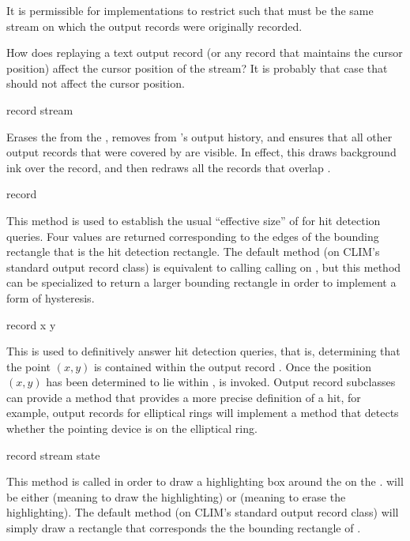 It is permissible for implementations to restrict  such
that  must be the same stream on which the output records were
originally recorded.

 {How does replaying a text output record (or any record that
maintains the cursor position) affect the cursor position of the stream?  It
is probably that case that  should not affect the cursor position.}


 {record stream}

Erases the   from the  , removes  from 's output history,
and ensures that all other output records that were covered by  are
visible.  In effect, this draws background ink over the record, and then redraws
all the records that overlap .

 {record}

This method is used to establish the usual ``effective size'' of 
for hit detection queries.  Four values are returned corresponding to the edges
of the bounding rectangle that is the hit detection rectangle.  The default
method (on CLIM's standard output record class) is equivalent to calling calling
 on , but this method can be specialized to
return a larger bounding rectangle in order to implement a form of hysteresis.

 {record x y}

This is used to definitively answer hit detection queries, that is, determining
that the point $(x,y)$ is contained within the output record .  Once
the position $(x,y)$ has been determined to lie within
,
 is invoked.  Output record
subclasses can provide a method that provides a more precise definition of a
hit, for example, output records for elliptical rings will implement a method
that detects whether the pointing device is on the elliptical ring.

 {record stream state}

This method is called in order to draw a highlighting box around the
  on the 
.   will be either  (meaning to draw the
highlighting) or  (meaning to erase the highlighting).  The
default method (on CLIM's standard output record class) will simply draw a
rectangle that corresponds the the bounding rectangle of .


